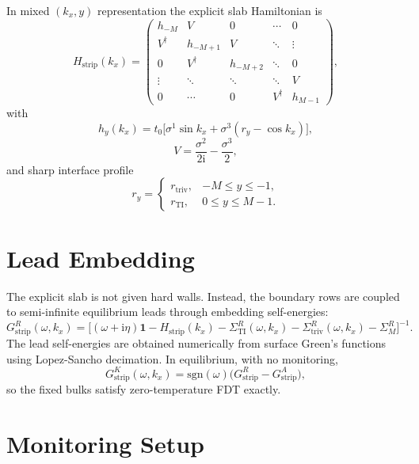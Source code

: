 \documentclass[11pt]{article}
\newcommand{\ii}{\mathrm{i}}
\newcommand{\sgn}{\mathrm{sgn}}
\newcommand{\Id}{\mathbf{1}}
\newcommand{\TI}{\mathrm{TI}}
\newcommand{\triv}{\mathrm{triv}}
\newcommand{\strip}{\mathrm{strip}}
\begin{document}
In mixed \((k_x,y)\) representation the explicit slab Hamiltonian is
\begin{equation}
  H_{\strip}(k_x)=
  \begin{pmatrix}
    h_{-M} & V & 0 & \cdots & 0\\
    V^\dagger & h_{-M+1} & V & \ddots & \vdots\\
    0 & V^\dagger & h_{-M+2} & \ddots & 0\\
    \vdots & \ddots & \ddots & \ddots & V\\
    0 & \cdots & 0 & V^\dagger & h_{M-1}
  \end{pmatrix},
\end{equation}
with
\begin{equation}
  h_y(k_x)
  =
  t_0\Big[
    \sigma^1\sin k_x
    + \sigma^3(r_y-\cos k_x)
  \Big],
\end{equation}
\begin{equation}
  V=\frac{\sigma^2}{2\ii}-\frac{\sigma^3}{2},
\end{equation}
and sharp interface profile
\begin{equation}
  r_y=
  \begin{cases}
    r_{\triv}, & -M \le y \le -1,\\[3pt]
    r_{\TI}, & 0 \le y \le M-1.
  \end{cases}
\end{equation}

\section{Lead Embedding}

The explicit slab is not given hard walls.  Instead, the boundary rows are
coupled to semi-infinite equilibrium leads through embedding self-energies:
\begin{equation}
  G_{\strip}^R(\omega,k_x)
  =
  \Big[
    (\omega+\ii \eta)\Id
    - H_{\strip}(k_x)
    - \Sigma_{\TI}^R(\omega,k_x)
    - \Sigma_{\triv}^R(\omega,k_x)
    - \Sigma_M^R
  \Big]^{-1}.
\end{equation}
The lead self-energies are obtained numerically from surface Green's functions
using Lopez-Sancho decimation.  In equilibrium, with no monitoring,
\begin{equation}
  G_{\strip}^K(\omega,k_x)
  =
  \sgn(\omega)\Big(G_{\strip}^R-G_{\strip}^A\Big),
\end{equation}
so the fixed bulks satisfy zero-temperature FDT exactly.

\section{Monitoring Setup}
\end{document}

